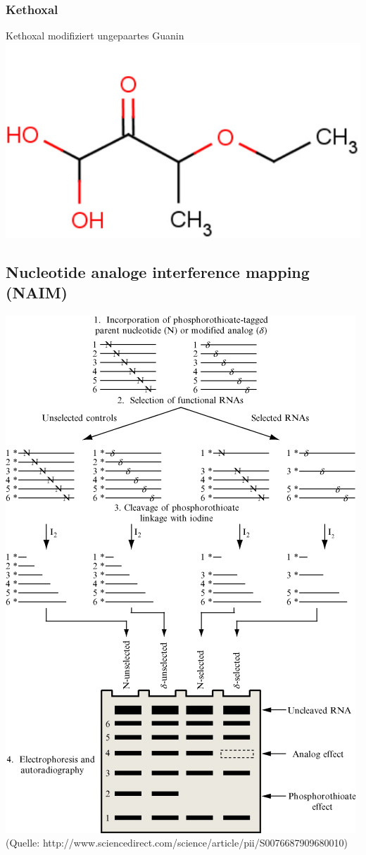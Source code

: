 \subsubsection{Kethoxal}
Kethoxal modifiziert ungepaartes Guanin \\
\includegraphics[scale=0.3]{lectures/160513/pix/Kethoxal.jpg}

\subsection{Nucleotide analoge interference mapping (NAIM)}
\includegraphics[scale=0.7]{lectures/160513/pix/NAIM.jpg} \\
(Quelle: http://www.sciencedirect.com/science/article/pii/S0076687909680010) \\
 
